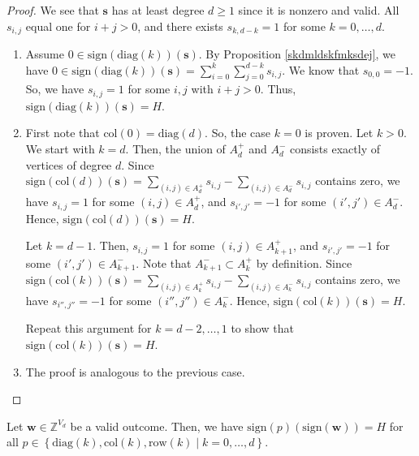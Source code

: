\begin{proof}
    We see that \( \mathbf{s} \) has at least degree \( d \geq 1 \) since it is nonzero and valid. All \( s_{i,j} \) equal one for \( i + j > 0 \), and there exists \( s_{k, d-k} = 1 \) for some \( k = 0, \dots, d \).

    \begin{enumerate}
        \item Assume \(0 \in \mathrm{sign}(\mathrm{diag}(k))(\mathbf{s}) \). By Proposition \ref{skdmldskfmksdej}, we have \( 0 \in \mathrm{sign}(\mathrm{diag}(k))(\mathbf{s}) = \sum_{i=0}^k \sum_{j=0}^{d-k} s_{i,j} \).
        We know that \( s_{0,0} = -1 \). So, we have \( s_{i,j} = 1 \) for some \( i,j \) with \( i + j > 0 \). Thus, \( \mathrm{sign}(\mathrm{diag}(k))(\mathbf{s}) = H \).
        
        \item First note that \( \mathrm{col}(0) = \mathrm{diag}(d) \). So, the case \( k = 0 \) is proven. Let \( k > 0 \). We start with \( k = d \). Then, the union of \( A^+_d \) and \( A^-_d \) consists exactly of vertices of degree \( d \). Since \( \mathrm{sign}(\mathrm{col}(d))(\mathbf{s}) =  \sum_{(i,j) \in A_d^+} s_{i,j} - \sum_{(i,j) \in A_d^-} s_{i,j} \) contains zero, we have \( s_{i,j} = 1 \) for some \( (i,j) \in A_d^+ \), and \( s_{i',j'} = -1 \) for some \( (i',j') \in A_d^- \). Hence, \( \mathrm{sign}(\mathrm{col}(d))(\mathbf{s}) = H \).
        
        Let \( k = d-1 \). Then, \( s_{i,j} = 1 \) for some \( (i,j) \in A_{k+1}^+ \), and \( s_{i',j'} = -1 \) for some \( (i',j') \in A_{k+1}^- \). Note that \( A_{k+1}^- \subset A^+_{k} \) by definition. Since \( \mathrm{sign}(\mathrm{col}(k))(\mathbf{s}) =  \sum_{(i,j) \in A_k^+} s_{i,j} - \sum_{(i,j) \in A_k^-} s_{i,j} \) contains zero, we have \( s_{i'',j''} = -1 \) for some \( (i'',j'') \in A_{k}^- \). Hence, \( \mathrm{sign}(\mathrm{col}(k))(\mathbf{s}) = H \).

        Repeat this argument for \( k = d-2, \dots, 1 \) to show that \( \mathrm{sign}(\mathrm{col}(k))(\mathbf{s}) = H \).

        \item The proof is analogous to the previous case.
    \end{enumerate}
\end{proof}

\begin{corollary}\label{cor:sign-sikjsfnfnuuusus}
    Let \( \mathbf{w} \in \mathbb{Z}^{V_d} \) be a valid outcome. Then, we have \( \mathrm{sign}(p)(\mathrm{sign}(\mathbf{w})) = H \) for all \( p \in \left\{ \mathrm{diag}(k), \mathrm{col}(k), \mathrm{row}(k) \mid k = 0, \dots, d \right\} \).
\end{corollary}

